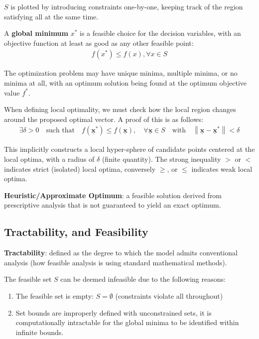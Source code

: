 \documentclass{article}
\begin{document}
\(S\) is plotted by introducing constraints one-by-one, keeping track of the region satisfying all at the same time.

A \textbf{global minimum} \(x^*\) is a feasible choice for the decision variables, with an objective function at least as good as any other feasible point:
\begin{align*}
    f\left(x^*\right) \leq f\left(x\right), \forall x \in S
\end{align*}

The optimization problem may have unique minima, multiple minima, or no minima at all, with an optimum solution being found at the optimum objective value \(f^*\).

When defining local optimality, we must check how the local region changes around the proposed optimal vector. A proof of this is as follows:
\begin{align*}
\exists \delta > 0 \quad \text{such that} \quad f(\underline{\textbf{x}}^*) \leq f(\underline{\textbf{x}}), \quad \forall \underline{\textbf{x}} \in S \quad \text{with} \quad \left\| \underline{\textbf{x}} - \underline{\textbf{x}}^* \right\| < \delta
\end{align*}

This implicitly constructs a local hyper-sphere of candidate points centered at the local optima, with a radius of \(\delta\) (finite quantity). The strong inequality \(>\) or \(<\) indicates strict (isolated) local optima, conversely \(\geq\), or \(\leq\) indicates weak local optima.


\textbf{Heuristic/Approximate Optimum}: a feasible solution derived from prescriptive analysis that is not guaranteed to yield an exact optimum.

\subsection{Tractability, and Feasibility}
\textbf{Tractability}: defined as the degree to which the model admits conventional analysis (how feasible analysis is using standard mathematical methods).

The feasible set \(S\) can be deemed infeasible due to the following reasons:
\begin{enumerate}
    \item The feasible set is empty: \(S = \emptyset\) (constraints violate all throughout)
    \item Set bounds are improperly defined with unconstrained sets, it is computationally intractable for the global minima to be identified within infinite bounds.
\end{enumerate}
\end{document}
